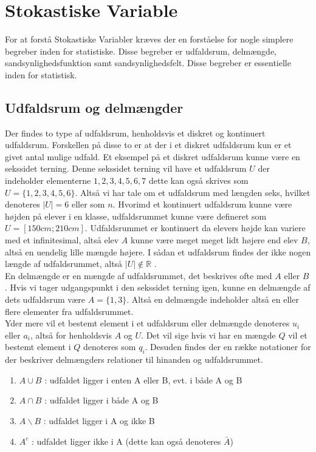 \documentclass[../../SRP.tex]{subfiles}
\begin{document}
\chapter{Stokastiske Variable}

For at forstå Stokastiske Variabler kræves der en forståelse for nogle simplere begreber inden for statistiske. Disse begreber er udfaldsrum, delmængde, sandsynlighedsfunktion samt sandsynlighedsfelt. Disse begreber er essentielle inden for statistisk.

\section{Udfaldsrum og delmængder}

Der findes to type af udfaldsrum, henholdsvis et diskret og kontinuert udfaldsrum. Forskellen på disse to er at der i et diskret udfaldsrum kun er et givet antal mulige udfald. Et eksempel på et diskret udfaldsrum kunne være en sekssidet terning. Denne sekssidet terning vil have et udfaldsrum $U$ der indeholder elementerne $1,2,3,4,5,6,7$ dette kan også skrives som $U = \{1,2,3,4,5,6\}$. Altså vi har tale om et udfaldsrum med længden seks, hvilket denoteres $|U| = 6$ eller som $n$. Hvorimd et kontinuert udfaldsrum kunne være højden på elever i en klasse, udfaldsrummet kunne være defineret som $U = [150cm;210cm]$. Udfaldsrummet er kontinuert da elevers højde kan variere med et infinitesimal, altså elev $A$ kunne være meget meget lidt højere end elev $B$, altså en uendelig lille mængde højere. I sådan et udfaldsrum findes der ikke nogen længde af udfaldsrummet, altså $|U| \notin \mathbb{R}$ \cite{SC}. \\

En delmængde er en mængde af udfaldsrummet, det beskrives ofte med $A$ eller $B$. Hvis vi tager udgangspunkt i den sekssidet terning igen, kunne en delmængde af dets udfaldsrum være $A = \{1,3\}$. Altså en delmængde indeholder altså en eller flere elementer fra udfaldsrummet. \\

Yder mere vil et bestemt element i et udfaldsrum eller delmængde denoteres $u_i$ eller $a_i$, altså for henholdsvis $A$ og $U$. Det vil sige hvis vi har en mængde $Q$ vil et bestemt element i $Q$ denoteres som $q_i$. Desuden findes der en række notationer for der beskriver delmængders relationer til hinanden og udfaldsrummet.
\begin{enumerate}
  \item $A \cup B$ : udfaldet ligger i enten A eller B, evt. i både A og B
  \item $A \cap B$ : udfaldet ligger i både A og B
  \item $A \backslash B$ : udfaldet ligger i A og ikke B
  \item $A^c$ : udfaldet ligger ikke i A (dette kan også denoteres $\bar{A}$)
\end{enumerate}
\end{document}
